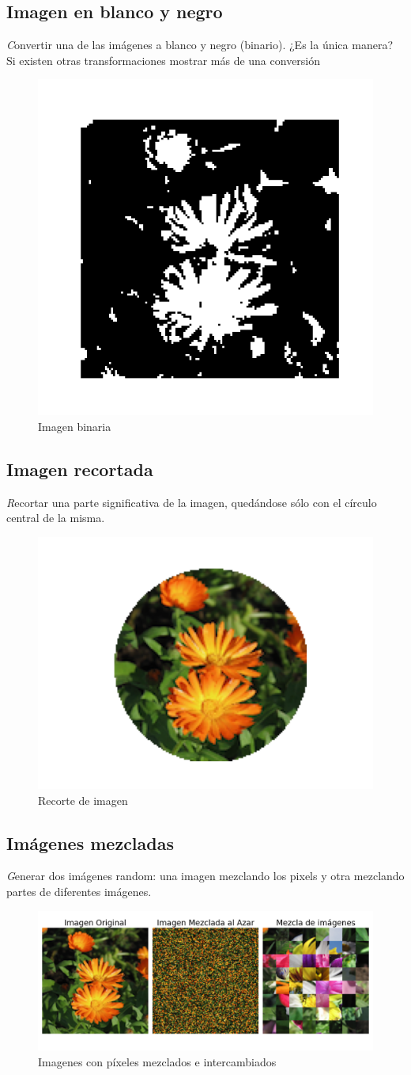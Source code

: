 \documentclass{article}
\begin{document}
\subsection{Imagen en blanco y negro}

{\emph Convertir una de las imágenes a blanco y negro (binario). ¿Es la única manera? Si existen otras transformaciones mostrar más de una conversión}
\pagebreak
\begin{figure}[h!]
  \centering    
  \includegraphics[width=.3\textwidth]{3_binario.png}
  \caption{Imagen binaria}
\end{figure}

\subsection{Imagen recortada}
\label{others}

{\emph Recortar una parte significativa de la imagen, quedándose sólo con el círculo central de la misma.}

\begin{figure}[h!]
  \centering    
  \includegraphics[width=.3\textwidth]{4_recortado.png}
  \caption{Recorte de imagen}
\end{figure}
\subsection{Imágenes mezcladas}

{\emph Generar dos imágenes random: una imagen mezclando los pixels y otra mezclando
partes de diferentes imágenes.}

\begin{figure}[h!]
  \centering    
  \includegraphics[width=.75\textwidth]{5_mezcla.png}
  \caption{Imagenes con píxeles mezclados e intercambiados}
\end{figure}
\end{document}
